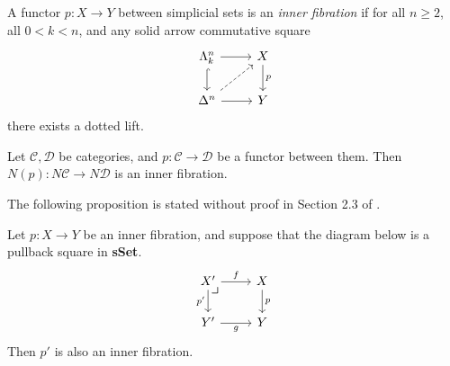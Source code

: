 \documentclass{MetricNotes2023}
\begin{document}
\begin{definition}
A functor \(p : X \to Y\) between simplicial sets is an \textit{inner fibration} if for all \(n \geq 2\), all \(0 < k < n\), and any solid arrow commutative square 
\[\begin{tikzcd}
\Lambda^n_k \arrow[r, ""] \arrow[d, hookrightarrow, swap, ""]  & X \arrow[d, "p"]  \\
\Delta^n \arrow[r, swap, ""] \arrow[ur, dashrightarrow, swap, ""]  & Y
\end{tikzcd}\]
there exists a dotted lift. 
\end{definition}

\begin{example}\label{ex:inner}
Let \(\mathcal{C}, \mathcal{D}\) be categories, and \(p : \mathcal{C} \to \mathcal{D}\) be a functor between them. Then \(N(p) : N \mathcal{C} \to N \mathcal{D}\) is an inner fibration.
\end{example}

The following proposition is stated without proof in Section 2.3 of \autocite{lurie2008higher}.

\begin{proposition}\label{pullback}
Let \(p : X \to Y\) be an inner fibration, and suppose that the diagram below is a pullback square in \textbf{sSet}.
\[\begin{tikzcd}
X' \arrow[r, "f"] \arrow[d, swap, "p'"] \arrow[dr, phantom, "\scalebox{1.3}{$\lrcorner$}" {xshift=-16pt, yshift=10pt}] & X \arrow[d, "p"]  \\
Y' \arrow[r, swap, "g"]  & Y
\end{tikzcd}\]
Then \(p'\) is also an inner fibration. 
\end{proposition}
\end{document}
